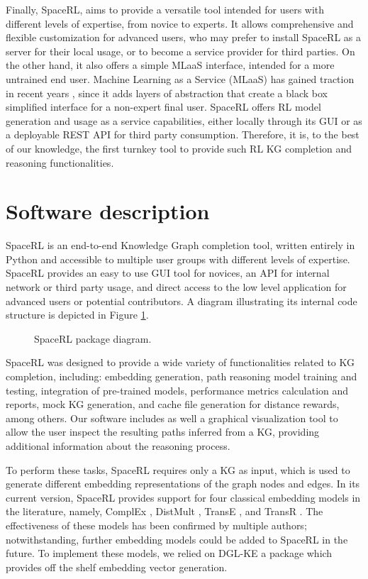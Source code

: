 Finally, SpaceRL, aims to provide a versatile tool intended for users with different levels of expertise, from novice to experts. It allows comprehensive and flexible customization for advanced users, who may prefer to install SpaceRL as a server for their local usage, or to become a service provider for third parties. On the other hand, it also offers a simple MLaaS interface, intended for a more untrained end user. Machine Learning as a Service (MLaaS) has gained traction in recent years 
\cite{RibeiroGC15}, since it adds layers of abstraction that create a black box simplified interface for a non-expert final user. SpaceRL offers RL model generation and usage as a service capabilities, either locally through its GUI or as a deployable REST API for third party consumption. Therefore, it is, to the best of our knowledge, the first turnkey tool to provide such RL KG completion and reasoning functionalities.

\section{Software description}\label{sec:framework-software}
SpaceRL is an end-to-end Knowledge Graph completion tool, written entirely in Python and accessible to multiple user groups with different levels of expertise. SpaceRL provides an easy to use GUI tool for novices, an API for internal network or third party usage, and direct access to the low level application for advanced users or potential contributors. A diagram illustrating its internal code structure is depicted in Figure \ref{fig:classdiagram}.

\begin{figure}[!h]
    \centering
    
    \caption{SpaceRL package diagram.}
    \label{fig:classdiagram}
\end{figure}

SpaceRL was designed to provide a wide variety of functionalities related to KG completion, including: embedding generation, path reasoning model training and testing, integration of pre-trained models, performance metrics calculation and reports, mock KG generation, and cache file generation for distance rewards, among others. Our software includes as well a graphical visualization tool to allow the user inspect the resulting paths inferred from a KG, providing additional information about the reasoning process.

To perform these tasks, SpaceRL requires only a KG as input, which is used to generate different embedding representations of the graph nodes and edges. In its current version, SpaceRL provides support for four classical embedding models in the literature, namely, ComplEx 
\cite{trouillon2016complex}, DistMult \cite{yang2014embedding}, TransE \cite{bordes2013translating}, and TransR \cite{lin2015learning}.
The effectiveness of these models has been confirmed by multiple authors; notwithstanding, further embedding models could be added to SpaceRL in the future. To implement these models, we relied on DGL-KE \cite{zheng2020dgl} a package which provides off the shelf embedding vector generation.

